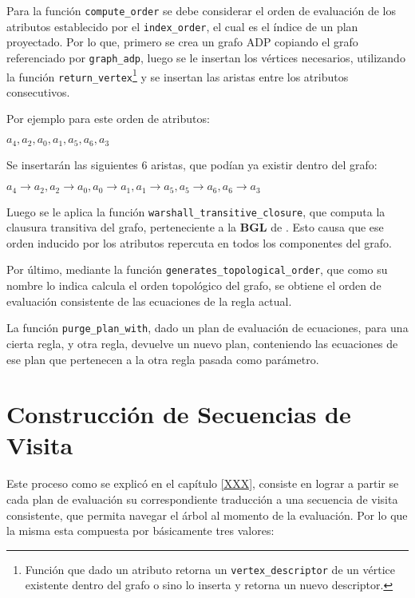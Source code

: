 Para la función \texttt{compute\_order} se debe considerar el orden de evaluación de los atributos establecido por el \texttt{index\_order}, el cual es el índice de un plan proyectado. Por lo que, primero se crea un grafo ADP copiando el grafo referenciado por \texttt{graph\_adp}, luego se le insertan los vértices necesarios, utilizando la función \texttt{return\_vertex}\footnote{Función que dado un atributo retorna un \texttt{vertex\_descriptor} de un vértice existente dentro del grafo o sino lo inserta y retorna un nuevo descriptor.} y se insertan las aristas entre los atributos consecutivos.

Por ejemplo para este orden de atributos:
\vspace{0.1cm}
\begin{center}
\Large\textbf{$a_{4}, a_{2}, a_{0}, a_{1}, a_{5}, a_{6}, a_{3}$}
\end{center}
\vspace{0.2cm}
Se insertarán las siguientes 6 aristas, que podían ya existir dentro del grafo:
\vspace{0.1cm}
\begin{center}
\Large\textbf{$a_{4} \rightarrow a_{2}, a_{2} \rightarrow a_{0}, a_{0} \rightarrow a_{1}, a_{1} \rightarrow a_{5}, a_{5} \rightarrow a_{6}, a_{6} \rightarrow a_{3}$}
\end{center}
\vspace{0.2cm}

Luego se le aplica la función \texttt{warshall\_transitive\_closure}, que computa la clausura transitiva del grafo, perteneciente a la \textbf{BGL} de \boost. Esto causa que ese orden inducido por los atributos repercuta en todos los componentes del grafo.

Por último, mediante la función \texttt{generates\_topological\_order}, que como su nombre lo indica calcula el orden topológico del grafo, se obtiene el orden de evaluación consistente de las ecuaciones de la regla actual.

La función \texttt{purge\_plan\_with}, dado un plan de evaluación de ecuaciones, para una cierta regla, y otra regla, devuelve un nuevo plan, conteniendo las ecuaciones de ese plan que pertenecen a la otra regla pasada como parámetro.

\section{Construcción de Secuencias de Visita}

Este proceso como se explicó en el capítulo \ref{XXX}, consiste en lograr a partir se cada plan de evaluación su correspondiente traducción a una secuencia de visita consistente, que permita navegar el árbol al momento de la evaluación. Por lo que la misma esta compuesta por básicamente tres valores:

